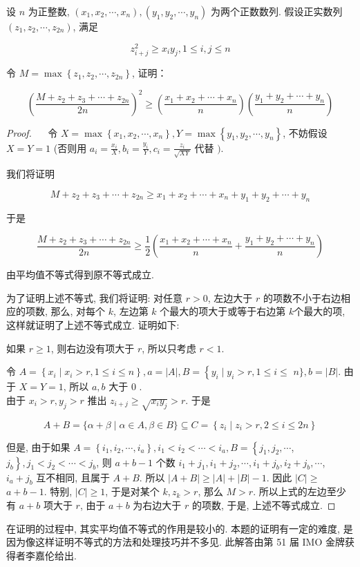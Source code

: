 \begin{example}
	设 $n$ 为正整数, $\left(x_{1}, x_{2}, \cdots, x_{n}\right),\left(y_{1}, y_{2}, \cdots, y_{n}\right)$ 为两个正数数列. 假设正实数列 $\left(z_{1}, z_{2}, \cdots, z_{2 n}\right)$, 满足
	
	$$
	z_{i+j}^{2} \geqslant x_{i} y_{j}, 1 \leqslant i, j \leqslant n
	$$
	
	令 $M=\max \left\{z_{1}, z_{2}, \cdots, z_{2 n}\right\}$, 证明：
	
	$$
	\left(\frac{M+z_{2}+z_{3}+\cdots+z_{2 n}}{2 n}\right)^{2} \geqslant\left(\frac{x_{1}+x_{2}+\cdots+x_{n}}{n}\right)\left(\frac{y_{1}+y_{2}+\cdots+y_{n}}{n}\right)
	$$
\end{example}
\begin{proof}
	$\quad$ 令 $X=\max \left\{x_{1}, x_{2}, \cdots, x_{n}\right\}, Y=\max \left\{y_{1}, y_{2}, \cdots, y_{n}\right\}$, 不妨假设 $X=Y=1$ (否则用 $a_{i}=\frac{x_{i}}{X}, b_{i}=\frac{y_{i}}{Y}, c_{i}=\frac{z_{i}}{\sqrt{X Y}}$ 代替 $)$.
	
	我们将证明
	
	$$
	M+z_{2}+z_{3}+\cdots+z_{2 n} \geqslant x_{1}+x_{2}+\cdots+x_{n}+y_{1}+y_{2}+\cdots+y_{n}
	$$
	
	于是
	
	$$
	\frac{M+z_{2}+z_{3}+\cdots+z_{2 n}}{2 n} \geqslant \frac{1}{2}\left(\frac{x_{1}+x_{2}+\cdots+x_{n}}{n}+\frac{y_{1}+y_{2}+\cdots+y_{n}}{n}\right)
	$$
	
	由平均值不等式得到原不等式成立.
	
	为了证明上述不等式, 我们将证明: 对任意 $r>0$, 左边大于 $r$ 的项数不小于右边相应的项数, 那么, 对每个 $k$, 左边第 $k$ 个最大的项大于或等于右边第 $k$个最大的项, 这样就证明了上述不等式成立. 证明如下:
	
	如果 $r \geqslant 1$, 则右边没有项大于 $r$, 所以只考虑 $r<1$.
	
	令 $A=\left\{x_{i} \mid x_{i}>r, 1 \leqslant i \leqslant n\right\}, a=|A|, B=\left\{y_{i} \mid y_{i}>r, 1 \leqslant i \leqslant\right.$ $n\}, b=|B|$. 由于 $X=Y=1$, 所以 $a, b$ 大于 0 .\\
	由于 $x_{i}>r, y_{j}>r$ 推出 $z_{i+j} \geqslant \sqrt{x_{i} y_{j}}>r$. 于是
	
	$$
	A+B=\{\alpha+\beta \mid \alpha \in A, \beta \in B\} \subseteq C=\left\{z_{i} \mid z_{i}>r, 2 \leqslant i \leqslant 2 n\right\}
	$$
	
	但是, 由于如果 $A=\left\{i_{1}, i_{2}, \cdots, i_{a}\right\}, i_{1}<i_{2}<\cdots<i_{a}, B=\left\{j_{1}, j_{2}, \cdots\right.$, $\left.j_{b}\right\}, j_{1}<j_{2}<\cdots<j_{b}$, 则 $a+b-1$ 个数 $i_{1}+j_{1}, i_{1}+j_{2}, \cdots, i_{1}+j_{b}, i_{2}+j_{b}, \cdots$, $i_{a}+j_{b}$ 互不相同, 且属于 $A+B$. 所以 $|A+B| \geqslant|A|+|B|-1$. 因此 $|C| \geqslant$ $a+b-1$. 特别, $|C| \geqslant 1$, 于是对某个 $k, z_{k}>r$, 那么 $M>r$. 所以上式的左边至少有 $a+b$ 项大于 $r$, 由于 $a+b$ 为右边大于 $r$ 的项数, 于是, 上述不等式成立.
\end{proof}
\begin{note}
	在证明的过程中, 其实平均值不等式的作用是较小的. 本题的证明有一定的难度, 是因为像这样证明不等式的方法和处理技巧并不多见. 此解答由第 51 届 IMO 金牌获得者李嘉伦给出.
\end{note}

